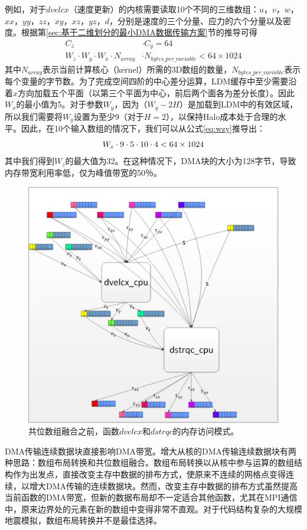 \documentclass[degree=doctor]{thuthesis}
\begin{document}
例如，对于$ dvelcx $（速度更新）的内核需要读取10个不同的三维数组：$ u $，$ v $，$ w $，$ xx $，$ yy $，$ zz $，$ xy $，$ xz $，$ yz $，$ d $，分别是速度的三个分量、应力的六个分量以及密度。根据第\ref{sec:基于二维划分的最小DMA数据传输方案}节的推导可得
\begin{equation}
\begin{aligned}
C_z &\cdot C_y = 64  \\
W_z \cdot W_y \cdot W_x \cdot N_{array} &\cdot N_{bytes\_per\_variable} < 64 \times 1024
\end{aligned}
\label{eq:wzy}
\end{equation}
其中$ N_{array} $表示当前计算核心（kernel）所需的3D数组的数量，$N_{bytes\_per\_variable}$表示每个变量的字节数。为了完成空间四阶的中心差分运算，LDM缓存中至少需要沿着$x$方向加载五个平面（以第三个平面为中心，前后两个面各为差分长度）。因此$ W_x $的最小值为5。对于参数$ W_y $，因为$（W_y-2H）$是加载到LDM中的有效区域，所以我们需要将$ W_y $设置为至少9（对于$ H = 2 $），以保持Halo成本处于合理的水平。因此，在10个输入数组的情况下，我们可以从公式\ref{eq:wzy}推导出：
\begin{equation}
W_z \cdot 9 \cdot 5 \cdot 10 \cdot 4 < 64 \times 1024\\
\label{eq:wzy1}
\end{equation}
其中我们得到$ W_z $的最大值为32。在这种情况下，DMA块的大小为128字节，导致内存带宽利用率低，仅为峰值带宽的50％。
\begin{figure}[ht]
\centering
\includegraphics[width=0.7\columnwidth]{awp_before.png}
\caption{共位数组融合之前，函数$dvelcx$和$dstrqc$的内存访问模式。}
\label{fig:array-fusion-before}
\end{figure}

DMA传输连续数据块直接影响DMA带宽。增大从核的DMA传输连续数据块有两种思路：数组布局转换和共位数组融合。数组布局转换以从核中参与运算的数组结构作为出发点，直接改变主存中数据的排布方式，使原来不连续的网格点变得连续，以增大DMA传输的连续数据块。然而，改变主存中数据的排布方式虽然提高当前函数的DMA带宽，但新的数据布局却不一定适合其他函数，尤其在MPI通信中，原来边界处的元素在新的数组中变得非常不直观。对于代码结构复杂的大规模地震模拟，数组布局转换并不是最佳选择。
\end{document}
